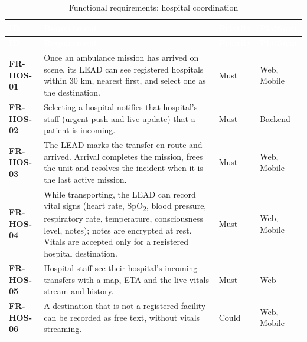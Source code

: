 {\tabfont\rowband
\begin{longtable}{@{}>{\raggedright\arraybackslash}p{}>{\raggedright\arraybackslash}p{}>{\raggedright\arraybackslash}p{}>{\raggedright\arraybackslash}p{}@{}}
\caption{Functional requirements: hospital coordination}\label{tab:fr-hos}\\
\rowcolor{najdanavy}\textcolor{white}{\sffamily\bfseries\small ID} & \textcolor{white}{\sffamily\bfseries\small Requirement} & \textcolor{white}{\sffamily\bfseries\small Priority} & \textcolor{white}{\sffamily\bfseries\small Platform}\\
\endfirsthead
\rowcolor{najdanavy}\textcolor{white}{\sffamily\bfseries\small ID} & \textcolor{white}{\sffamily\bfseries\small Requirement} & \textcolor{white}{\sffamily\bfseries\small Priority} & \textcolor{white}{\sffamily\bfseries\small Platform}\\
\endhead
\bottomrule\endlastfoot
\textbf{FR-HOS-01} & Once an ambulance mission has arrived on scene, its LEAD can see registered hospitals within 30 km, nearest first, and select one as the destination. & Must & Web, Mobile\\
\textbf{FR-HOS-02} & Selecting a hospital notifies that hospital’s staff (urgent push and live update) that a patient is incoming. & Must & Backend\\
\textbf{FR-HOS-03} & The LEAD marks the transfer en route and arrived. Arrival completes the mission, frees the unit and resolves the incident when it is the last active mission. & Must & Web, Mobile\\
\textbf{FR-HOS-04} & While transporting, the LEAD can record vital signs (heart rate, SpO\textsubscript{2}, blood pressure, respiratory rate, temperature, consciousness level, notes); notes are encrypted at rest. Vitals are accepted only for a registered hospital destination. & Must & Web, Mobile\\
\textbf{FR-HOS-05} & Hospital staff see their hospital’s incoming transfers with a map, ETA and the live vitals stream and history. & Must & Web\\
\textbf{FR-HOS-06} & A destination that is not a registered facility can be recorded as free text, without vitals streaming. & Could & Web, Mobile\\
\end{longtable}}
